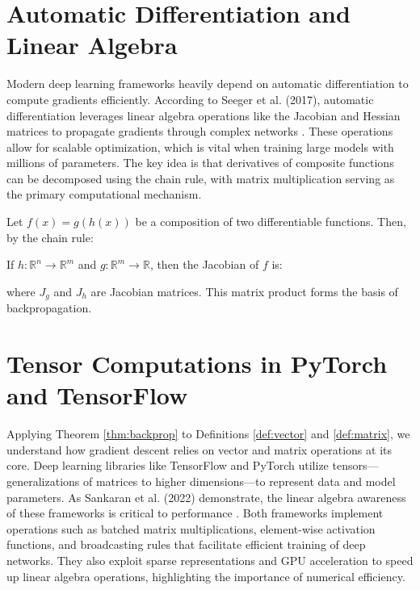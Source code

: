\documentclass{article}
\begin{document}

\section{Automatic Differentiation and Linear Algebra}
Modern deep learning frameworks heavily depend on automatic differentiation to compute gradients efficiently. According to Seeger et al. (2017), automatic differentiation leverages linear algebra operations like the Jacobian and Hessian matrices to propagate gradients through complex networks \cite{seeger2017auto}. These operations allow for scalable optimization, which is vital when training large models with millions of parameters. The key idea is that derivatives of composite functions can be decomposed using the chain rule, with matrix multiplication serving as the primary computational mechanism.

\begin{theorem}\label{thm:backprop}
    Let $f(x) = g(h(x))$ be a composition of two differentiable functions. Then, by the chain rule:

If $h : \mathbb{R}^n \to \mathbb{R}^m$ and $g : \mathbb{R}^m \to \mathbb{R}$, then the Jacobian of $f$ is:

where $J_g$ and $J_h$ are Jacobian matrices. This matrix product forms the basis of backpropagation.
\end{theorem}


\section{Tensor Computations in PyTorch and TensorFlow}
Applying Theorem \ref{thm:backprop} to Definitions \ref{def:vector} and \ref{def:matrix}, we understand how gradient descent relies on vector and matrix operations at its core. Deep learning libraries like TensorFlow and PyTorch utilize tensors—generalizations of matrices to higher dimensions—to represent data and model parameters. As Sankaran et al. (2022) demonstrate, the linear algebra awareness of these frameworks is critical to performance \cite{sankaran2022benchmarking}. Both frameworks implement operations such as batched matrix multiplications, element-wise activation functions, and broadcasting rules that facilitate efficient training of deep networks. They also exploit sparse representations and GPU acceleration to speed up linear algebra operations, highlighting the importance of numerical efficiency.
\end{document}
